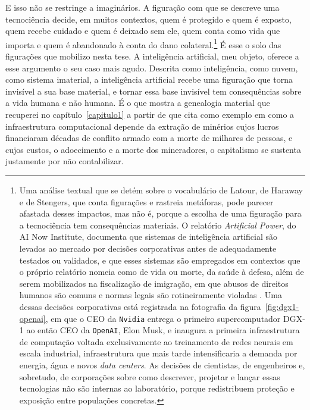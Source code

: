 E isso não se restringe a imaginários. A figuração com que se descreve uma tecnociência decide, em muitos contextos, quem é protegido e quem é exposto, quem recebe cuidado e quem é deixado sem ele, quem conta como vida que importa e quem é abandonado à conta do dano colateral.\footnote{Uma análise textual que se detém sobre o vocabulário de Latour, de Haraway e de Stengers, que conta figurações e rastreia metáforas, pode parecer afastada desses impactos, mas não é, porque a escolha de uma figuração para a tecnociência tem consequências materiais. O relatório \emph{Artificial Power}, do AI Now Institute, documenta que sistemas de inteligência artificial são levados ao mercado por decisões corporativas antes de adequadamente testados ou validados, e que esses sistemas são empregados em contextos que o próprio relatório nomeia como de vida ou morte, da saúde à defesa, além de serem mobilizados na fiscalização de imigração, em que abusos de direitos humanos são comuns e normas legais são rotineiramente violadas \parencite[pp.~15, 9]{Brennan2025ArtificialPower}. Uma dessas decisões corporativas está registrada na fotografia da figura~\ref{fig:dgx1-openai}, em que o CEO da \texttt{Nvidia} entrega o primeiro supercomputador DGX-1 ao então CEO da \texttt{OpenAI}, Elon Musk, e inaugura a primeira infraestrutura de computação voltada exclusivamente ao treinamento de redes neurais em escala industrial, infraestrutura que mais tarde intensificaria a demanda por energia, água e novos \emph{data centers}. As decisões de cientistas, de engenheiros e, sobretudo, de corporações sobre como descrever, projetar e lançar essas tecnologias não são internas ao laboratório, porque redistribuem proteção e exposição entre populações concretas.} É esse o solo das figurações que mobilizo nesta tese. A inteligência artificial, meu objeto, oferece a esse argumento o seu caso mais agudo. Descrita como inteligência, como nuvem, como sistema imaterial, a inteligência artificial recebe uma figuração que torna invisível a sua base material, e tornar essa base invisível tem consequências sobre a vida humana e não humana. É o que mostra a genealogia material que recuperei no capítulo~\ref{capitulo1} a partir de \textcite{Crawford2021Atlas} que cita como exemplo em como a infraestrutura computacional depende da extração de minérios cujos lucros financiaram décadas de conflito armado com a morte de milhares de pessoas, e cujos custos, o adoecimento e a morte dos mineradores, o capitalismo se sustenta justamente por não contabilizar.%

